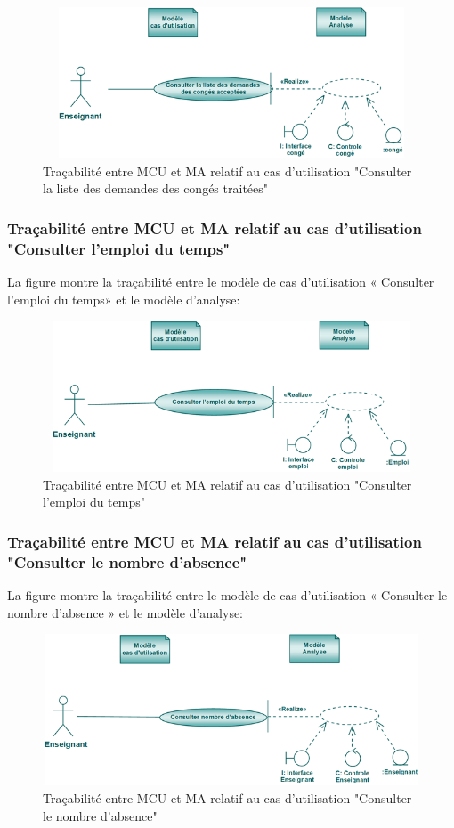 \documentclass[12 pt]{report}
\begin{document}
\begin{figure}[h]
\begin{center}
\includegraphics[width= 14cm , height =4.5cm]{tccr.png}
\caption{Traçabilité entre MCU et MA relatif au cas d’utilisation "Consulter la liste des demandes des congés traitées"}
\end{center}
\end{figure}
\subsubsection{Traçabilité entre MCU et MA relatif au cas d’utilisation "Consulter l'emploi du temps" }
La figure  montre la traçabilité entre le modèle de cas d’utilisation « Consulter l'emploi du temps» et le modèle d’analyse:

\begin{figure}[h]
\begin{center}
\includegraphics[width= 14cm , height =4.5cm]{cee.png}
\caption{Traçabilité entre MCU et MA relatif au cas d’utilisation "Consulter l'emploi du temps"}
\end{center}
\end{figure}
\subsubsection{Traçabilité entre MCU et MA relatif au cas d’utilisation "Consulter le nombre d'absence" }
La figure  montre la traçabilité entre le modèle de cas d’utilisation « Consulter le nombre d'absence » et le modèle d’analyse:

\begin{figure}[h]
\begin{center}
\includegraphics[width= 14cm , height =4.5cm]{tcna.PNG}
\caption{Traçabilité entre MCU et MA relatif au cas d’utilisation "Consulter le nombre d'absence"}
\end{center}
\end{figure}
\end{document}
